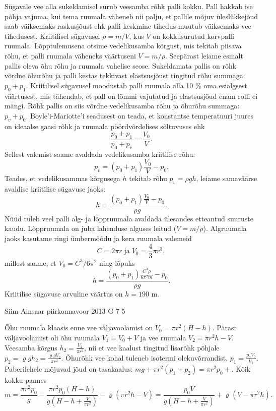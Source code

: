 \documentclass[11pt, twoside]{article}
\begin{document}
{{\ifSolution
Sügavale vee alla sukeldamisel surub veesamba rõhk palli kokku. Pall hakkab ise põhja vajuma, kui tema ruumala väheneb nii palju, et pallile mõjuv üleslükkejõud saab väiksemaks raskusjõust ehk palli keskmine tihedus muutub väiksemaks vee tihedusest. Kriitilisel sügavusel $\rho=m/V$, kus $V$ on kokkusurutud korvpalli ruumala. Lõpptulemusena otsime vedelikusamba kõrgust, mis tekitab piisava rõhu, et palli ruumala väheneks väärtuseni $V=m/\rho$. Seepärast leiame esmalt pallis oleva õhu rõhu ja ruumala vahelise seose. Sukeldamata pallis on rõhk võrdne õhurõhu ja palli kestas tekkivast elastsusjõust tingitud rõhu summaga: $p_0+p_1$. Kriitilisel sügavusel moodustab palli ruumala alla 10 \% oma esialgsest väärtusest, mis tähendab, et pall on lömmi vajutatud ja elastsusjõud enam rolli ei mängi. Rõhk pallis on siis võrdne vedelikusamba rõhu ja õhurõhu summaga: $p_v+p_0$. Boyle'i-Mariotte'i seadusest on teada, et konstantse temperatuuri juures on ideaalse gaasi rõhk ja ruumala pöördvõrdelises sõltuvuses ehk
\[
\frac{p_0+p_1}{p_0+p_v}=\frac{V_0}{V}.
\]
Sellest valemist saame avaldada vedelikusamba kriitilise rõhu:
\[
p_v = (p_0+p_1) \frac{V_0}{V} - p_0.
\]
Teades, et vedelikusammas kõrgusega $h$ tekitab rõhu $p_v=\rho g h$, leiame samaväärse avaldise kriitilise sügavuse jaoks:
\[
h = \frac{(p_0+p_1) \frac{V_0}{V} - p_0}{\rho g}.
\]
Nüüd tuleb veel palli alg- ja lõppruumala avaldada ülesandes etteantud suuruste kaudu. Lõppruumala on juba lahenduse alguses leitud ($V=m/\rho$). Algruumala jaoks kasutame ringi ümbermõõdu ja kera ruumala valemeid
\[
C = 2\pi r \; \text{ja} \; V_0 = \frac{4}{3}\pi r^3,
\]
millest saame, et $V_0=C^3/6\pi^2$ ning lõpuks
\[
h = \frac{(p_0+p_1) \frac{C^3 \rho}{6\pi^2 m} - p_0}{\rho g}.
\]
Kriitilise sügavuse arvuline väärtus on $h=190$ m.
\fi
}

{Siim Ainsaar} %
{piirkonnavoor} %
{2013} %
{G 7} %
{5} %
{

\ifSolution
Õhu ruumala klaasis enne vee väljavoolamist on 
$V_0 = \pi r^2 (H-h)$.
Pärast väljavoolamist oli õhu ruumala
$V_1 = V_0 + V$
ja vee ruumala
$V_2 = \pi r^2 h - V$.
Veesamba kõrgus
$h_2 = \frac{ V_2 }{ \pi r^2 }$,
nii et vee kaalust tingitud lisarõhk põhjale
$p_2 = \varrho g h_2 = \frac{ \varrho g V_2 }{ \pi r^2 }$. Õhurõhk vee kohal tuleneb isotermi olekuvõrrandist,
$p_1 = \frac{p_0 V_0}{V_1}$.
Paberilehele mõjuvad jõud on tasakaalus:
$mg + \pi r^2 (p_1 + p_2) = \pi r^2 p_0+$.
Kõik kokku pannes
\[ m =
\frac{ \pi r^2 p_0 }{ g } -
\frac{ \pi r^2 p_0 (H-h) }{ g \left( H - h + \frac{V}{\pi r^2} \right) } -
\varrho \left( \pi r^2 h - V \right)
=
\frac{ p_0 V }{ g \left( H - h + \frac{V}{ \pi r^2 } \right) } + \varrho \left( V - \pi r^2 h \right).
\]
\fi
}

}
\end{document}
